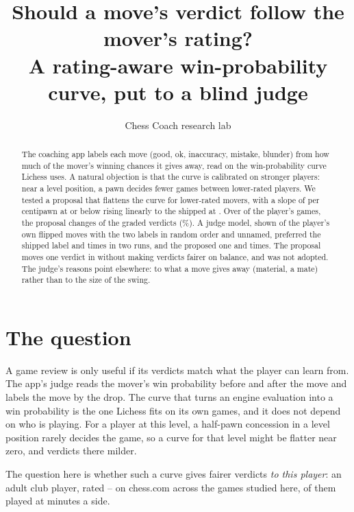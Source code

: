 \documentclass[11pt]{article}
\title{Should a move's verdict follow the mover's rating?\\[0.3em]
\large A rating-aware win-probability curve, put to a blind judge}
\author{Chess Coach research lab}
\date{}
\begin{document}
\maketitle

\begin{abstract}
The coaching app labels each move (good, ok, inaccuracy, mistake, blunder) from how much
of the mover's winning chances it gives away, read on the win-probability curve Lichess
uses. A natural objection is that the curve is calibrated on stronger players: near a
level position, a pawn decides fewer games between lower-rated players. We tested a
proposal that flattens the curve for lower-rated movers, with a slope of \LowSlope{} per
centipawn at or below \RatingFloor{} rising linearly to the shipped \ShippedSlope{} at
\RatingTop{}. Over \Games{} of the player's games, the proposal changes \Flips{} of the
\GradedPlies{} graded verdicts (\FlipShare\%). A judge model, shown \JudgeMoves{} of the
player's own flipped moves with the two labels in random order and unnamed, preferred the
shipped label \ShippedRunOne{} and \ShippedRunTwo{} times in two runs, and the proposed one
\ProposedRunOne{} and \ProposedRunTwo{} times. The proposal moves one verdict in \FlipOneIn{}
without making verdicts fairer on balance, and was not adopted. The judge's reasons point
elsewhere: to what a move gives away (material, a mate) rather than to the size of the swing.
\end{abstract}

\section{The question}

A game review is only useful if its verdicts match what the player can learn from. The
app's judge reads the mover's win probability before and after the move and labels the
move by the drop. The curve that turns an engine evaluation into a win probability is the
one Lichess fits on its own games, and it does not depend on who is playing. For a player
at this level, a half-pawn concession in a level position rarely decides the game, so a
curve for that level might be flatter near zero, and verdicts there milder.

The question here is whether such a curve gives fairer verdicts \emph{to this player}: an
adult club player, rated \PlayerRatingMin--\PlayerRatingMax{} on chess.com across the \Games{} games
studied here, \MainTcGames{} of them played at \MainTcMinutes{} minutes a side.
\end{document}
